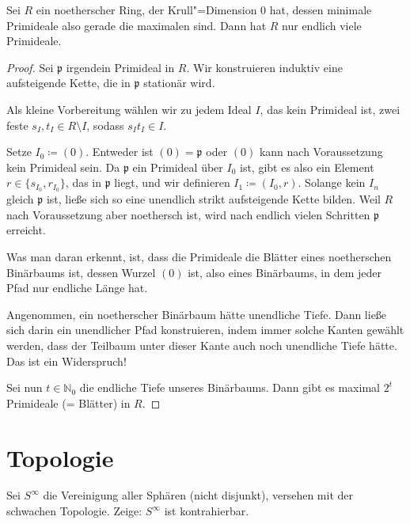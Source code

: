 \documentclass[ngerman, 11pt, a4paper, twoside, abstracton]{scrbook}
\begin{document}
\begin{exercise}
  Sei $R$ ein noetherscher Ring, der Krull"=Dimension 0 hat, dessen minimale Primideale also gerade die maximalen sind. Dann hat $R$ nur endlich viele Primideale.
\end{exercise}
\begin{proof}
  Sei $\mathfrak{p}$ irgendein Primideal in $R$. Wir konstruieren induktiv eine aufsteigende Kette, die in $\mathfrak{p}$ stationär wird.

  Als kleine Vorbereitung wählen wir zu jedem Ideal $I$, das kein Primideal ist, zwei feste $s_I, t_I\in R\setminus I$, sodass $s_It_I\in I$.

  Setze $I_0 \coloneqq \left( 0 \right)$. Entweder ist $\left( 0 \right) = \mathfrak{p}$ oder $\left( 0 \right)$ kann nach Voraussetzung kein Primideal sein. Da $\mathfrak{p}$ ein Primideal über $I_0$ ist, gibt es also ein Element $r\in\{s_{I_0}, r_{I_0} \}$, das in $\mathfrak{p}$ liegt, und wir definieren $I_1\coloneqq \left( I_0, r \right)$. Solange kein $I_n$ gleich $\mathfrak{p}$ ist, ließe sich so eine unendlich strikt aufsteigende Kette bilden. Weil $R$ nach Voraussetzung aber noethersch ist, wird nach endlich vielen Schritten $\mathfrak{p}$ erreicht.

  Was man daran erkennt, ist, dass die Primideale die Blätter eines noetherschen Binärbaums ist, dessen Wurzel $\left( 0 \right)$ ist, also eines Binärbaums, in dem jeder Pfad nur endliche Länge hat.

  Angenommen, ein noetherscher Binärbaum hätte unendliche Tiefe. Dann ließe sich darin ein unendlicher Pfad konstruieren, indem immer solche Kanten gewählt werden, dass der Teilbaum unter dieser Kante auch noch unendliche Tiefe hätte. Das ist ein Widerspruch!

  Sei nun $t\in \mathbb{N}_0$ die endliche Tiefe unseres Binärbaums. Dann gibt es maximal $2^t$ Primideale (= Blätter) in $R$.
\end{proof}

\section{Topologie}

\begin{exercise}
  Sei $S^\infty$ die Vereinigung aller Sphären (nicht disjunkt), versehen mit der schwachen Topologie. Zeige: $S^\infty$ ist kontrahierbar.
\end{exercise}
\end{document}
